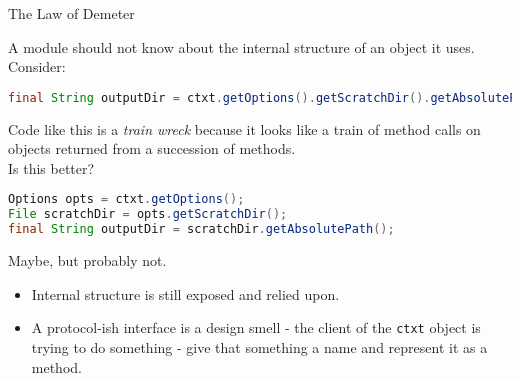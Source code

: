 \documentclass{beamer}
\begin{document}
\begin{frame}[fragile]{The Law of Demeter}


A module should not know about the internal structure of an object it uses.  Consider:
\begin{lstlisting}[language=Java]
final String outputDir = ctxt.getOptions().getScratchDir().getAbsolutePath();
\end{lstlisting}
Code like this is a {\it train wreck} because it looks like a train of method calls on objects returned from a succession of methods.\\
\vspace{.1in}
Is this better?
\begin{lstlisting}[language=Java]
Options opts = ctxt.getOptions();
File scratchDir = opts.getScratchDir();
final String outputDir = scratchDir.getAbsolutePath();
\end{lstlisting}

Maybe, but probably not.
\begin{itemize}
\item Internal structure is still exposed and relied upon.
\item A protocol-ish interface is a design smell - the client of the {\tt ctxt} object is trying to do something - give that something a name and represent it as a method.
\end{itemize}

\end{frame}
\end{document}
